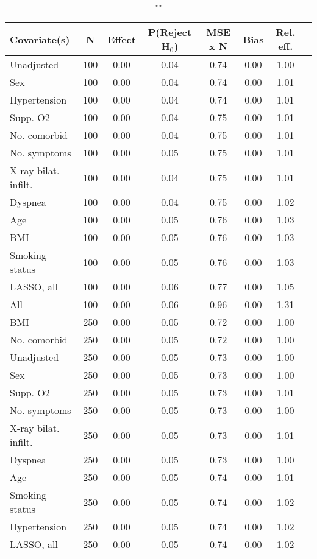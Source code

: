 \documentclass{article}
\begin{document}
{\tabcolsep=6pt  %
\begin{longtable}{lccccccc}
\caption{""} \\
Covariate(s) & N & Effect & P(Reject H$_0$) & MSE x N & Bias & Rel. eff.\\ \midrule
Unadjusted & 100 & 0.00 & 0.04 & 0.74 & 0.00 & 1.00 \\ 
Sex & 100 & 0.00 & 0.04 & 0.74 & 0.00 & 1.01 \\ 
Hypertension & 100 & 0.00 & 0.04 & 0.74 & 0.00 & 1.01 \\ 
Supp. O2 & 100 & 0.00 & 0.04 & 0.75 & 0.00 & 1.01 \\ 
No. comorbid & 100 & 0.00 & 0.04 & 0.75 & 0.00 & 1.01 \\ 
No. symptoms & 100 & 0.00 & 0.05 & 0.75 & 0.00 & 1.01 \\ 
X-ray bilat. infilt. & 100 & 0.00 & 0.04 & 0.75 & 0.00 & 1.01 \\ 
Dyspnea & 100 & 0.00 & 0.04 & 0.75 & 0.00 & 1.02 \\ 
Age & 100 & 0.00 & 0.05 & 0.76 & 0.00 & 1.03 \\ 
BMI & 100 & 0.00 & 0.05 & 0.76 & 0.00 & 1.03 \\ 
Smoking status & 100 & 0.00 & 0.05 & 0.76 & 0.00 & 1.03 \\ 
LASSO, all & 100 & 0.00 & 0.06 & 0.77 & 0.00 & 1.05 \\ 
All & 100 & 0.00 & 0.06 & 0.96 & 0.00 & 1.31 \\ \midrule 
BMI & 250 & 0.00 & 0.05 & 0.72 & 0.00 & 1.00 \\ 
No. comorbid & 250 & 0.00 & 0.05 & 0.72 & 0.00 & 1.00 \\ 
Unadjusted & 250 & 0.00 & 0.05 & 0.73 & 0.00 & 1.00 \\ 
Sex & 250 & 0.00 & 0.05 & 0.73 & 0.00 & 1.00 \\ 
Supp. O2 & 250 & 0.00 & 0.05 & 0.73 & 0.00 & 1.01 \\ 
No. symptoms & 250 & 0.00 & 0.05 & 0.73 & 0.00 & 1.00 \\ 
X-ray bilat. infilt. & 250 & 0.00 & 0.05 & 0.73 & 0.00 & 1.01 \\ 
Dyspnea & 250 & 0.00 & 0.05 & 0.73 & 0.00 & 1.00 \\ 
Age & 250 & 0.00 & 0.05 & 0.74 & 0.00 & 1.01 \\ 
Smoking status & 250 & 0.00 & 0.05 & 0.74 & 0.00 & 1.02 \\ 
Hypertension & 250 & 0.00 & 0.05 & 0.74 & 0.00 & 1.02 \\ 
LASSO, all & 250 & 0.00 & 0.05 & 0.74 & 0.00 & 1.02 \\ 

\end{longtable}}
\end{document}
